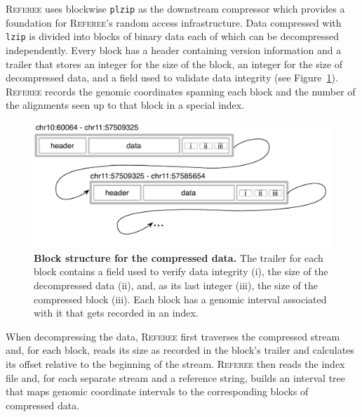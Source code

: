 \documentclass[12pt]{cmuthesis}
\newcommand{\refer}{\textsc{Referee}\xspace}
\begin{document}
  \refer uses blockwise \texttt{plzip} as the downstream compressor which provides a foundation for \refer's random access infrastructure. Data compressed with \texttt{lzip} is divided into blocks of binary data each of which can be decompressed independently. Every block has a header containing version information and a trailer that stores an integer for the size of the block, an integer for the size of decompressed data, and a field used to validate data integrity (see Figure~\ref{fig:referee:block_struct}). \refer records the genomic coordinates spanning each block and the number of the alignments seen up to that block in a special index.
  \begin{figure}[ht]
    \centering
    \includegraphics[width=0.8\linewidth]{figures/block_struct}
    \caption{\textbf{Block structure for the compressed data.} The trailer for each block contains a field used to verify data integrity (i), the size of the decompressed data (ii), and, as its last integer (iii), the size of the compressed block (iii). Each block has a genomic interval associated with it that gets recorded in an index.}
    \label{fig:referee:block_struct}
  \end{figure}
  When decompressing the data, \refer first traverses the compressed stream and, for each block, reads its size as recorded in the block's trailer and calculates its offset relative to the beginning of the stream. \refer then reads the index file and, for each separate stream and a reference string, builds an interval tree that maps genomic coordinate intervals to the corresponding blocks of compressed data.
\end{document}
